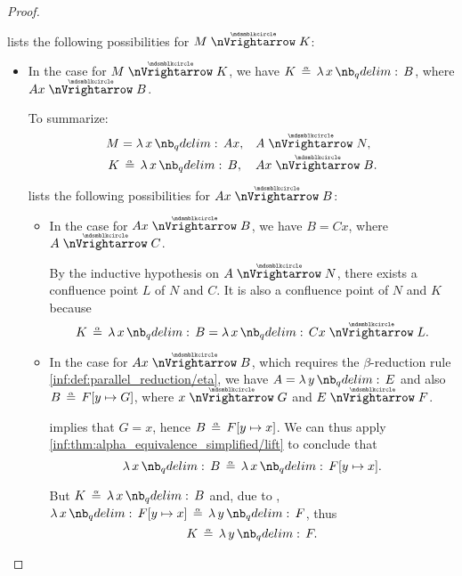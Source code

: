 \begin{proof}
\begin{itemize}
     lists the following possibilities for \( M \ppred K \):
    \begin{itemize}
      \item In the case  for \( M \ppred K \), we have \( K \aequiv \qabs x B \), where \( Ax \ppred B \).

      To summarize:
      \begin{align*}
        M &= \qabs x A x,        &&A \ppred N, \\
        K &\aequiv \qabs x B,    &&Ax \ppred B.
      \end{align*}

       lists the following possibilities for \( Ax \ppred B \):
      \begin{itemize}
        \item In the case  for \( Ax \ppred B \), we have \( B = Cx \), where \( A \ppred C \).

        By the inductive hypothesis on \( A \ppred N \), there exists a confluence point \( L \) of \( N \) and \( C \). It is also a confluence point of \( N \) and \( K \) because
        \begin{equation*}
          K \aequiv \qabs x B = \qabs x Cx \ppred L.
        \end{equation*}

        \item In the case  for \( Ax \ppred B \), which requires the \( \beta \)-reduction rule \ref{inf:def:parallel_reduction/eta}, we have \( A = \qabs y E \) and also \( B \aequiv F[y \mapsto G] \), where \( x \ppred G \) and \( E \ppred F \).

         implies that \( G = x \), hence \( B \aequiv F[y \mapsto x] \). We can thus apply \ref{inf:thm:alpha_equivalence_simplified/lift} to conclude that
        \begin{equation*}
          \qabs x B \aequiv \qabs x F[y \mapsto x].
        \end{equation*}

        But \( K \aequiv \qabs x B \) and, due to , \( \qabs x F[y \mapsto x] \aequiv \qabs y F \), thus
        \begin{equation*}
          K \aequiv \qabs y F.
        \end{equation*}


\end{itemize}
\end{itemize}
\end{itemize}
\end{proof}
